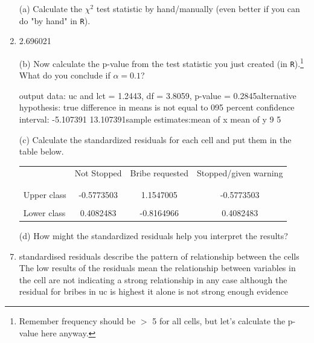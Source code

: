 \documentclass[12pt,letterpaper]{article}
\begin{document}
	\begin{enumerate}
		
		\item [(a)]
		Calculate the $\chi^2$ test statistic by hand/manually (even better if you can do "by hand" in \texttt{R}).\\
		\vspace{1cm}
		
		  
		
		\item  2.696021
		
		
		
			\item [(b)]
		Now calculate the p-value from the test statistic you just created (in \texttt{R}).\footnote{Remember frequency should be $>$ 5 for all cells, but let's calculate the p-value here anyway.}  What do you conclude if $\alpha = 0.1$?\\
		
		
			 
			\item[output] data:  uc and lct = 1.2443, df = 3.8059, p-value = 0.2845alternative hypothesis: true difference in means is not equal to 095 percent confidence interval: -5.107391 13.107391sample estimates:mean of x mean of y         9         5 
		
		\newpage
		\item [(c)] Calculate the standardized residuals for each cell and put them in the table below.
		\vspace{1cm}
		
		\begin{table}[h]
			\centering
			\begin{tabular}{l | c c c }
				& Not Stopped & Bribe requested & Stopped/given warning \\
				\\[-1.8ex] 
				\hline \\[-1.8ex]
				Upper class  &-0.5773503   & 1.1547005 &-0.5773503   \\
				\\
				Lower class & 0.4082483 & -0.8164966   &  0.4082483 \\
				
			\end{tabular}
		\end{table}
		 

		\vspace{7cm}
		\item [(d)] How might the standardized residuals help you interpret the results?  
		\item standardised residuals describe the pattern of relationship between the cells
		The low results of the residuals mean the relationship between variables in the cell 
		are not indicating a strong relationship in any case although the residual for bribes 
		in uc is highest it alone is not strong enough evidence
	\end{enumerate}
	\newpage
	
\end{document}
